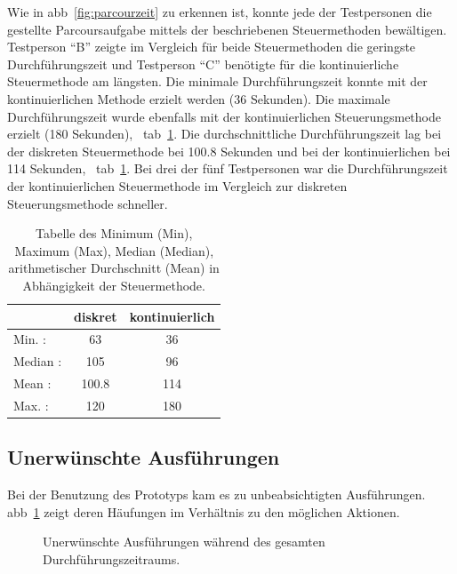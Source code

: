 Wie in \acs{abb}~\ref{fig:parcourzeit} zu erkennen ist, konnte jede der Testpersonen die gestellte Parcoursaufgabe mittels der beschriebenen Steuermethoden bewältigen. Testperson \enquote{B} zeigte im Vergleich für beide Steuermethoden die geringste Durchführungszeit und Testperson \enquote{C} benötigte für die kontinuierliche Steuermethode am längsten. Die minimale Durchführungszeit konnte mit der kontinuierlichen Methode erzielt werden (36 Sekunden). Die maximale Durchführungszeit wurde ebenfalls mit der kontinuierlichen Steuerungsmethode erzielt (180 Sekunden), \vgl~\acs{tab}~\ref{tab:parcourstat}. Die durchschnittliche Durchführungszeit lag bei der diskreten Steuermethode bei 100.8 Sekunden und bei der kontinuierlichen bei 114 Sekunden, \vgl~\acs{tab}~\ref{tab:parcourstat}. Bei drei der fünf Testpersonen war die Durchführungszeit der kontinuierlichen Steuermethode im Vergleich zur diskreten Steuerungsmethode schneller. 

\begin{table}[h]
\centering
\begin{tabular}{lcc}
  \hline
 &    diskret & kontinuierlich \\ 
  \hline
Min.   :&  63   & 36   \\ 
 Median : & 105  & 96   \\ 
 Mean   : & 100.8   & 114   \\  
 Max.   : & 120  &    180   \\ 
   \hline
\end{tabular}
\caption{Tabelle des Minimum (Min), Maximum (Max), Median (Median), arithmetischer Durchschnitt (Mean) in Abhängigkeit der Steuermethode.} 
\label{tab:parcourstat}
\end{table}

\subsection{Unerwünschte Ausführungen}
Bei der Benutzung des Prototyps kam es zu unbeabsichtigten Ausführungen. \acl{abb}~\ref{fig:ausführungen} zeigt deren Häufungen im Verhältnis zu den möglichen Aktionen.
\begin{figure}[ht]
\begin{minipage}[t]{\linewidth} 
\centering
{}
\caption{Unerwünschte Ausführungen während des gesamten Durchführungszeitraums.}
\label{fig:ausführungen}
  \end{minipage}%
\end{figure}

